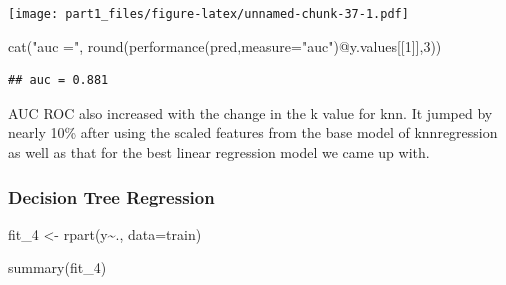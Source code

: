 \documentclass[
]{article}
\newenvironment{Shaded}{\begin{snugshade}}{\end{snugshade}}
\newcommand{\AttributeTok}[1]{\textcolor[rgb]{0.77,0.63,0.00}{#1}}
\newcommand{\DecValTok}[1]{\textcolor[rgb]{0.00,0.00,0.81}{#1}}
\newcommand{\FunctionTok}[1]{\textcolor[rgb]{0.00,0.00,0.00}{#1}}
\newcommand{\NormalTok}[1]{#1}
\newcommand{\OtherTok}[1]{\textcolor[rgb]{0.56,0.35,0.01}{#1}}
\newcommand{\SpecialCharTok}[1]{\textcolor[rgb]{0.00,0.00,0.00}{#1}}
\newcommand{\StringTok}[1]{\textcolor[rgb]{0.31,0.60,0.02}{#1}}
\begin{document}
\begin{Shaded}
\end{Shaded}

\texttt{[image: part1\_files/figure-latex/unnamed-chunk-37-1.pdf]}

\begin{Shaded}
\begin{Highlighting}[]
\FunctionTok{cat}\NormalTok{(}\StringTok{"auc ="}\NormalTok{, }\FunctionTok{round}\NormalTok{(}\FunctionTok{performance}\NormalTok{(pred,}\AttributeTok{measure=}\StringTok{"auc"}\NormalTok{)}\SpecialCharTok{@}\NormalTok{y.values[[}\DecValTok{1}\NormalTok{]],}\DecValTok{3}\NormalTok{))}
\end{Highlighting}
\end{Shaded}

\begin{verbatim}
## auc = 0.881
\end{verbatim}

AUC ROC also increased with the change in the k value for knn. It jumped
by nearly 10\% after using the scaled features from the base model of
knnregression as well as that for the best linear regression model we
came up with.

\hypertarget{decision-tree-regression}{%
\subsubsection{Decision Tree
Regression}\label{decision-tree-regression}}

\begin{Shaded}
\begin{Highlighting}[]
\NormalTok{fit\_4 }\OtherTok{\textless{}{-}} \FunctionTok{rpart}\NormalTok{(y}\SpecialCharTok{\textasciitilde{}}\NormalTok{.,}
               \AttributeTok{data=}\NormalTok{train)}
\end{Highlighting}
\end{Shaded}

\begin{Shaded}
\begin{Highlighting}[]
\FunctionTok{summary}\NormalTok{(fit\_4)}
\end{Highlighting}
\end{Shaded}
\end{document}
